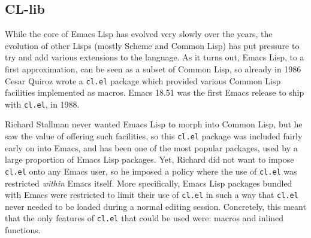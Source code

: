 \documentclass[format=acmsmall, review]{acmart}
\newcommand \Elisp {Emacs Lisp}
\begin{document}
\subsection{CL-lib}          %
\label{sec:cl-clib}

While the core of \Elisp{} has evolved very slowly over the years, the
evolution of other Lisps (mostly Scheme and Common Lisp) has put pressure to
try and add various extensions to the language.  As it turns out, \Elisp{},
to a first approximation, can be seen as a subset of Common Lisp, so already
in 1986 Cesar Quiroz  wrote a \texttt{cl.el} package which provided various
Common Lisp facilities implemented as macros.  Emacs 18.51 was the
first Emacs release to ship with \texttt{cl.el}, in 1988.

Richard Stallman never wanted \Elisp{} to morph into Common Lisp, but he saw
the value of offering such facilities, so this \texttt{cl.el} package was
included fairly early on into Emacs, and has been one of the most popular
packages, used by a large proportion of \Elisp{} packages.  Yet, Richard did
not want to impose \texttt{cl.el} onto any Emacs user, so he imposed
a policy where the use of \texttt{cl.el} was restricted \emph{within} Emacs
itself.  More specifically, \Elisp{} packages bundled with Emacs were
restricted to limit their use of \texttt{cl.el} in such a way that
\texttt{cl.el} never needed to be loaded during a normal editing session.
Concretely, this meant that the only features of \texttt{cl.el} that could
be used were: macros and inlined functions.
\end{document}
